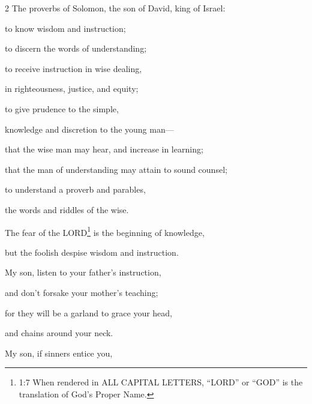 




\vspace{-1.36in}
	
\begin{multicols}{2}
\mychapter{} \myverse*{}The proverbs of Solomon, the son of David, king of Israel:

\myverse{}to know wisdom and instruction;

to discern the words of understanding;


\myverse{}to receive instruction in wise dealing,

in righteousness, justice, and equity;


\myverse{}to give prudence to the simple,

knowledge and discretion to the young man—


\myverse{}that the wise man may hear, and increase in learning;

that the man of understanding may attain to sound counsel;


\myverse{}to understand a proverb and parables,

the words and riddles of the wise.


\vspace{\baselineskip} 
\myverse{}The fear of the LORD\footnote{1:7 When rendered in ALL CAPITAL LETTERS, “LORD” or “GOD” is the translation of God’s Proper Name.}
is the beginning of knowledge,

but the foolish despise wisdom and instruction.


\myverse{}My son, listen to your father’s instruction,

and don’t forsake your mother’s teaching;


\myverse{}for they will be a garland to grace your head,

and chains around your neck.


\myverse{}My son, if sinners entice you,


\end{multicols}
